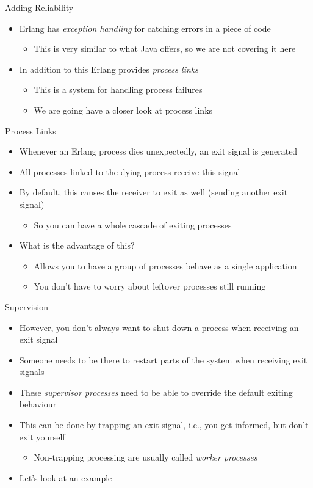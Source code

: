 \documentclass[12pt,xcolor=svgnames]{beamer}
\begin{document}
\begin{frame}{Adding Reliability}
\begin{itemize}
\item Erlang has \emph{exception handling} for catching errors in a piece of code
\begin{itemize}
\item This is very similar to what Java offers, so we are not covering it here
\end{itemize}
\item In addition to this Erlang provides \emph{process links}
\begin{itemize}
\item This is a system for handling process failures
\item We are going have a closer look at process links
\end{itemize}
\end{itemize}
\end{frame}

\begin{frame}{Process Links}
\begin{itemize}
\item Whenever an Erlang process dies unexpectedly, an exit signal is generated
\item All processes linked to the dying process receive this signal
\item By default, this causes the receiver to exit as well (sending another exit signal)
\begin{itemize}
\item So you can have a whole cascade of exiting processes
\end{itemize}
\item What is the advantage of this?
\begin{itemize}
\item Allows you to have a group of processes behave as a single application
\item You don't have to worry about leftover processes still running
\end{itemize}
\end{itemize}
\end{frame}

\begin{frame}{Supervision}
\begin{itemize}
\item However, you don't always want to shut down a process when receiving an exit signal
\item Someone needs to be there to restart parts of the system when receiving exit signals
\item These \emph{supervisor processes} need to be able to override the default exiting behaviour
\item This can be done by trapping an exit signal, i.e., you get informed, but don't exit yourself
\begin{itemize}
\item Non-trapping processing are usually called \emph{worker processes}
\end{itemize}
\item Let's look at an example
\end{itemize}
\end{frame}
\end{document}
